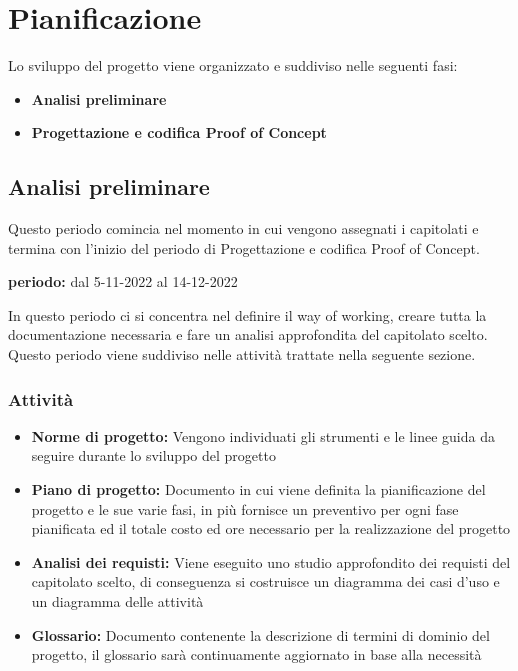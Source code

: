 \section{Pianificazione}
Lo sviluppo del progetto viene organizzato e suddiviso nelle seguenti fasi:
\begin{itemize}
\item \textbf{Analisi preliminare}
\item \textbf{Progettazione e codifica Proof of Concept}
\end{itemize}


\subsection{Analisi preliminare}
Questo periodo comincia nel momento in cui vengono assegnati i capitolati e termina con l'inizio del periodo di Progettazione e codifica Proof of Concept.\\
\begin{center}
\textbf{periodo:} dal 5-11-2022 al 14-12-2022\\
\end{center}
In questo periodo ci si concentra nel definire il way of working, creare tutta la documentazione necessaria e fare un analisi approfondita del capitolato scelto.  Questo periodo viene suddiviso nelle attività trattate nella seguente sezione.

\subsubsection{Attività}
\begin{itemize}
\item \textbf{Norme di progetto:} Vengono individuati gli strumenti e le linee guida da seguire durante lo sviluppo del progetto
\item \textbf{Piano di progetto:} Documento in cui viene definita la pianificazione del progetto e le sue varie fasi,  in più fornisce un preventivo per ogni fase pianificata ed il totale costo ed ore necessario per la realizzazione del progetto
\item \textbf{Analisi dei requisti:} Viene eseguito uno studio approfondito dei requisti del capitolato scelto,  di conseguenza si costruisce un diagramma dei casi d'uso e un diagramma delle attività
\item \textbf{Glossario: } Documento contenente la descrizione di termini di dominio del progetto, il glossario sarà continuamente aggiornato in base alla necessità
\end{itemize}

